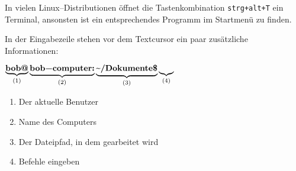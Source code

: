 In vielen Linux--Distributionen öffnet die Tastenkombination \lstinline$strg+alt+T$ ein Terminal, ansonsten ist ein entsprechendes Programm im Startmenü zu finden.

In der Eingabezeile stehen vor dem Textcursor ein paar zusätzliche Informationen:

\( \underbrace{\textbf{\lstinline|bob@|}}_{(1)}\underbrace{\textbf{\lstinline|bob-computer:|}}_{(2)}\underbrace{\textbf{\textapprox\lstinline|/Dokumente$|}}_{(3)}\underbrace{ }_{(4)} \)

\begin{multicols}{2}
\begin{enumerate}
\item Der aktuelle Benutzer
\item Name des Computers
\item Der Dateipfad, in dem gearbeitet wird
\item Befehle eingeben
\end{enumerate}
\end{multicols}

